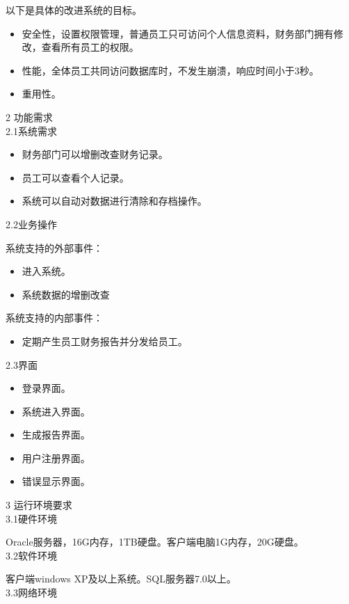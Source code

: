 \documentclass[UTF8,nofonts]{ctexart}
\begin{document}
以下是具体的改进系统的目标。
\begin{itemize}
\setlength{\itemsep}{0pt}
\setlength{\parskip}{0pt}
\setlength{\parsep}{0pt}
	\item 安全性，设置权限管理，普通员工只可访问个人信息资料，财务部门拥有修改，查看所有员工的权限。
	\item 性能，全体员工共同访问数据库时，不发生崩溃，响应时间小于3秒。
	\item 重用性。
\end{itemize}
2 功能需求\\
2.1系统需求
\begin{itemize}
\setlength{\itemsep}{0pt}
\setlength{\parskip}{0pt}
\setlength{\parsep}{0pt}
	\item 财务部门可以增删改查财务记录。
	\item 员工可以查看个人记录。
	\item 系统可以自动对数据进行清除和存档操作。
\end{itemize}
2.2业务操作

系统支持的外部事件：
\begin{itemize}
\setlength{\itemsep}{0pt}
\setlength{\parskip}{0pt}
\setlength{\parsep}{0pt}
	\item 进入系统。
	\item 系统数据的增删改查
\end{itemize}

系统支持的内部事件：
\begin{itemize}
\setlength{\itemsep}{0pt}
\setlength{\parskip}{0pt}
\setlength{\parsep}{0pt}
	\item 定期产生员工财务报告并分发给员工。
\end{itemize}
2.3界面
\begin{itemize}
\setlength{\itemsep}{0pt}
\setlength{\parskip}{0pt}
\setlength{\parsep}{0pt}
	\item 登录界面。
	\item 系统进入界面。
	\item 生成报告界面。
	\item 用户注册界面。
	\item 错误显示界面。
\end{itemize}
3 运行环境要求\\
3.1硬件环境

Oracle服务器，16G内存，1TB硬盘。客户端电脑1G内存，20G硬盘。\\
3.2软件环境

客户端windows XP及以上系统。SQL服务器7.0以上。\\
3.3网络环境
\end{document}
